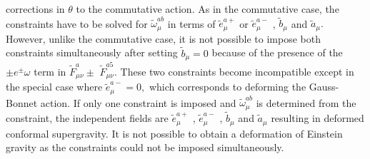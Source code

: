 \documentclass[a4paper,a4paper]{article}
\begin{document}
corrections in $\theta$ to the commutative action. As in the commutative case,
the constraints have to be solved for $\widetilde{\omega}_{\mu}^{ab}$ in terms
of $\widetilde{e}_{\mu}^{a+}$ or $\widetilde{e}_{\mu}^{a-}$ , $\widetilde
{b}_{\mu}$ and $\widetilde{a}_{\mu}.$ However, unlike the commutative case, it
is not possible to impose both constraints simultaneously after setting
$\widetilde{b}_{\mu}=0$ because of the presence of the $\pm e^{\pm}\omega$
term in $\widetilde{F}_{\mu\nu}^{a}\pm$ $\widetilde{F}_{\mu\nu}^{a5}$. These
two constraints become incompatible except in the special case where
$\widetilde{e}_{\mu}^{a-}=0,$ which corresponds to deforming the Gauss-Bonnet
action. If only one constraint is imposed and $\widetilde{\omega}_{\mu}^{ab}$
is determined from the constraint, the independent fields are $\widetilde
{e}_{\mu}^{a+}$ , $\widetilde{e}_{\mu}^{a-}$ , $\widetilde{b}_{\mu}$ and
$\widetilde{a}_{\mu}$ resulting in deformed conformal supergravity. It is not
possible to obtain a deformation of Einstein gravity as the constraints could
not be imposed simultaneously.\qquad
\end{document}
